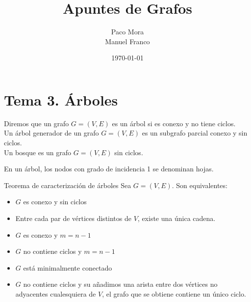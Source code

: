\documentclass[openany]{book}
\title{Apuntes de Grafos}
\author{Paco Mora\\Manuel Franco}
\date{\today}
\begin{document}
\maketitle
\chapter{Tema 3. Árboles}
\begin{definition}
    Diremos que un grafo $ G = (V,E)$ es un árbol si es conexo y no tiene ciclos.\\
    Un árbol generador de un grafo $ G= (V,E) $ es un subgrafo parcial conexo y sin ciclos.\\
    Un bosque es un grafo $ G = (V,E) $ sin ciclos. 
\end{definition}


\begin{definition}
    En un árbol, los nodos con grado de incidencia 1 se denominan hojas.
\end{definition}

\begin{theorem}
    Teorema de caracterización de árboles
    Sea $ G = (V,E) $. Son equivalentes:
    \begin{itemize}
        \item $ G $ es conexo y sin ciclos
        \item Entre cada par de vértices distintos de $ V $, existe una única cadena.
        \item $ G $ es conexo y $ m = n-1 $
        \item $ G $ no contiene ciclos y $ m = n-1 $
        \item $ G $ está minimalmente conectado
        \item $ G $ no contiene ciclos y su añadimos una arista entre dos vértices no adyacentes cualesquiera de $ V $, el grafo que se obtiene contiene un único ciclo. 
    \end{itemize}
\end{theorem}
\end{document}
